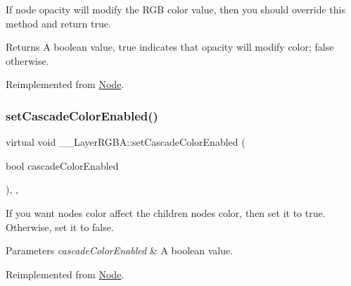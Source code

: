 If node opacity will modify the R\+GB color value, then you should override this method and return true. \begin{DoxyReturn}{Returns}
A boolean value, true indicates that opacity will modify color; false otherwise. 
\end{DoxyReturn}


Reimplemented from \hyperlink{classNode_ae6ce32d2088e2bb3426608334f1091c5}{Node}.

\mbox{\label{class____LayerRGBA_a6559d3d54c2a7a8a35873390043b0aa6}} 
\subsubsection{\texorpdfstring{set\+Cascade\+Color\+Enabled()}{setCascadeColorEnabled()}\hspace{0.1cm}{\footnotesize\ttfamily [1/2]}}
{\footnotesize\ttfamily virtual void \+\_\+\+\_\+\+Layer\+R\+G\+B\+A\+::set\+Cascade\+Color\+Enabled (\begin{DoxyParamCaption}\item[{bool}]{cascade\+Color\+Enabled }\end{DoxyParamCaption})\hspace{0.3cm}{\ttfamily [inline]}, {\ttfamily [override]}, {\ttfamily [virtual]}}

If you want node\textquotesingle{}s color affect the children node\textquotesingle{}s color, then set it to true. Otherwise, set it to false. 
\begin{DoxyParams}{Parameters}
{\em cascade\+Color\+Enabled} & A boolean value. \\
\hline
\end{DoxyParams}


Reimplemented from \hyperlink{classNode_a4e7f2dde1e3a7d56880f59f1480955e7}{Node}.

\mbox{\label{class____LayerRGBA_a6559d3d54c2a7a8a35873390043b0aa6}} 
